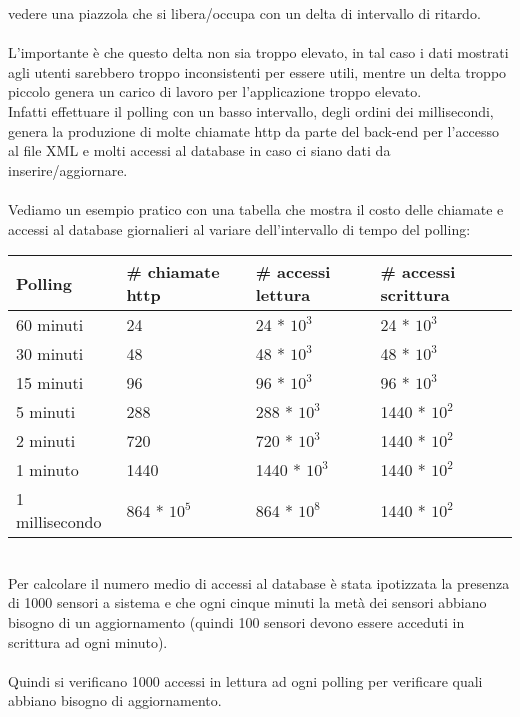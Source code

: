 vedere una piazzola che si libera/occupa con un delta di intervallo di ritardo. 
\\\\
L'importante è che questo delta non sia troppo elevato, in tal caso i dati mostrati agli utenti sarebbero troppo
inconsistenti per essere utili, mentre un delta troppo piccolo genera un carico di lavoro per l'applicazione troppo
elevato.
\\
Infatti effettuare il polling con un basso intervallo, degli ordini dei millisecondi, genera la produzione di molte 
chiamate http da parte del back-end per l'accesso al file XML e molti accessi al database in caso ci siano dati da 
inserire/aggiornare.
\\\\
Vediamo un esempio pratico con una tabella che mostra il costo delle chiamate e accessi al database giornalieri al variare 
dell'intervallo di tempo del polling:
\\
\begin{table}
    \begin{tabular}{|p{2.85cm}|p{2.85cm}|p{2.85cm}|p{2.85cm}|} 
    \hline
    Polling & \# chiamate http  & \# accessi lettura & \# accessi scrittura \\ 
    \hline
    60 minuti & 24 & 24 * $10^3$ & 24 * $10^3$ \\
    \hline
    30 minuti & 48 & 48 * $10^3$ & 48 * $10^3$ \\
    \hline
    15 minuti & 96 & 96 * $10^3$ & 96 * $10^3$ \\
    \hline
    5 minuti & 288 & 288 * $10^3$ & 1440 * $10^2$ \\
    \hline
    2 minuti & 720 & 720 * $10^3$ & 1440 * $10^2$ \\
    \hline
    1 minuto & 1440 & 1440 * $10^3$ & 1440 * $10^2$ \\
    \hline
    1 millisecondo & 864 * $10^5$ & 864 * $10^8$ & 1440 * $10^2$ \\
    \hline
    \end{tabular}
\end{table}
\leavevmode\newline
\\
Per calcolare il numero medio di accessi al database è stata ipotizzata la presenza di 1000 sensori a sistema e che 
ogni cinque minuti la metà dei sensori abbiano bisogno di un aggiornamento (quindi 100 sensori devono essere 
acceduti in scrittura ad ogni minuto). 
\\\\
Quindi si verificano 1000 accessi in lettura ad ogni polling per verificare quali abbiano bisogno di aggiornamento.
